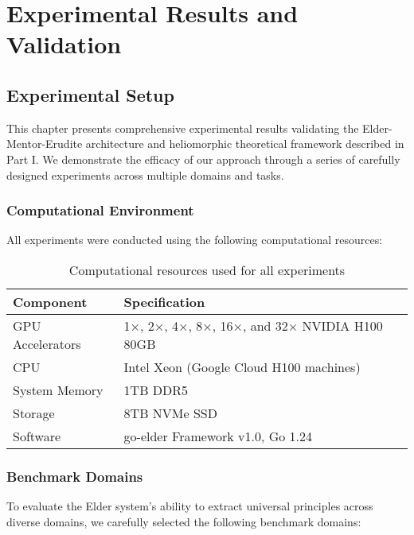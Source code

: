 \chapter{Experimental Results and Validation}

\section{Experimental Setup}

This chapter presents comprehensive experimental results validating the Elder-Mentor-Erudite architecture and heliomorphic theoretical framework described in Part I. We demonstrate the efficacy of our approach through a series of carefully designed experiments across multiple domains and tasks.

\subsection{Computational Environment}

All experiments were conducted using the following computational resources:

\begin{table}[h]
\centering
\begin{tabular}{|l|l|}
\hline
\textbf{Component} & \textbf{Specification} \\
\hline
GPU Accelerators & 1×, 2×, 4×, 8×, 16×, and 32× NVIDIA H100 80GB \\
\hline
CPU & Intel Xeon (Google Cloud H100 machines) \\
\hline
System Memory & 1TB DDR5 \\
\hline
Storage & 8TB NVMe SSD \\
\hline
Software & go-elder Framework v1.0, Go 1.24 \\
\hline
\end{tabular}
\caption{Computational resources used for all experiments}
\label{tab:computational_resources}
\end{table}

\subsection{Benchmark Domains}

To evaluate the Elder system's ability to extract universal principles across diverse domains, we carefully selected the following benchmark domains:


